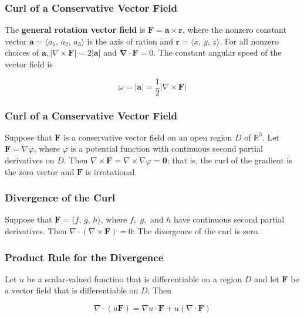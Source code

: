\subsubsection{Curl of a Conservative Vector Field}
The \textbf{general rotation vector field} is $\mathbf{F = a \times r}$, where the nonzero constant vector $\mathbf{a} = \langle a_1,\, a_2,\, a_3 \rangle$ is the axis of ration and $\mathbf{r} = \langle x,\, y,\, z \rangle$. For all nonzero choices of $\mathbf{a}, | \nabla \times \mathbf{F} | = 2|\mathbf{a}|$ and $\mathbf{\nabla \cdot F} = 0$. The constant angular speed of the vector field is

\begin{equation}
    \omega = |\mathbf{a}| = \frac{1}{2}| \nabla \times \mathbf{F} |
\end{equation}

\subsubsection{Curl of a Conservative Vector Field}
Suppose that $\mathbf{F}$ is a conservative vector field on an open region $D$ of $\mathbb{R}^3$. Let $\mathbf{F} = \nabla \varphi$, where $\varphi$ is a potential function with continuous second partial derivatives on $D$. Then $\nabla \times \mathbf{F} = \nabla \times \nabla \varphi = \mathbf{0}$; that is, the curl of the gradient is the zero vector and $\mathbf{F}$ is irrotational.

\subsubsection{Divergence of the Curl}
Suppose that $\mathbf{F} = \langle f,\, g,\, h \rangle$, where $f$,\, $g$,\, and $h$ have continuous second partial derivatives. Then $\nabla \cdot \left( \nabla \times \mathbf{F} \right) = 0$: The divergence of the curl is zero.

\subsubsection{Product Rule for the Divergence}
Let $u$ be a scalar-valued functino that is differentiable on a region $D$ and let $\mathbf{F}$ be a vector field that is differentiable on $D$. Then

\begin{equation}
    \nabla \cdot (u \mathbf{F}) = \nabla u \cdot \mathbf{F} + u (\nabla \cdot \mathbf{F})
\end{equation}

